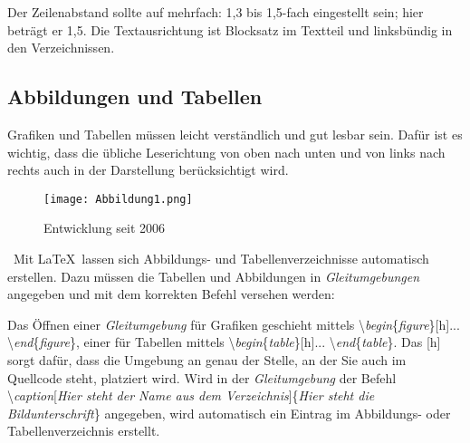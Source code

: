 \documentclass[a4paper,11pt]{article}%
\renewcommand{\\}{\vspace*{0.5\baselineskip} \newline}
\begin{document}
Der Zeilenabstand sollte auf mehrfach: 1,3 bis 1,5-fach eingestellt sein; hier beträgt er 1,5. Die Textausrichtung ist Blocksatz im Textteil und linksbündig in den Verzeichnissen.



\subsection{Abbildungen und Tabellen}

Grafiken und Tabellen müssen leicht verständlich und gut lesbar sein. Dafür ist es wichtig, dass die übliche Leserichtung von oben nach unten und von links nach rechts auch in der Darstellung berücksichtigt wird.

\begin{figure}[h]

	\texttt{[image: Abbildung1.png]}\\

	\begin{footnotesize}

		\caption[Abbildung 1]{Entwicklung seit 2006}

	\end{footnotesize}

\end{figure}

~\newline Mit \LaTeX~lassen sich Abbildungs- und Tabellenverzeichnisse automatisch erstellen. Dazu müssen die Tabellen und Abbildungen in \textit{Gleitumgebungen} angegeben und mit dem korrekten Befehl versehen werden: \\

Das Öffnen einer \textit{Gleitumgebung} für Grafiken geschieht mittels \textbackslash\textit{begin}\{\textit{figure}\}[h]... \textbackslash\textit{end}\{\textit{figure}\}, einer für Tabellen mittels \textbackslash\textit{begin}\{\textit{table}\}[h]... \textbackslash\textit{end}\{\textit{table}\}. Das [h] sorgt dafür, dass die Umgebung an genau der Stelle, an der Sie auch im Quellcode steht, platziert wird. Wird in der \textit{Gleitumgebung} der Befehl \textbackslash\textit{caption}[\textit{Hier steht der Name aus dem Verzeichnis}]\{\textit{Hier steht die Bildunterschrift}\} angegeben, wird automatisch ein Eintrag im Abbildungs- oder Tabellenverzeichnis erstellt.
\end{document}

